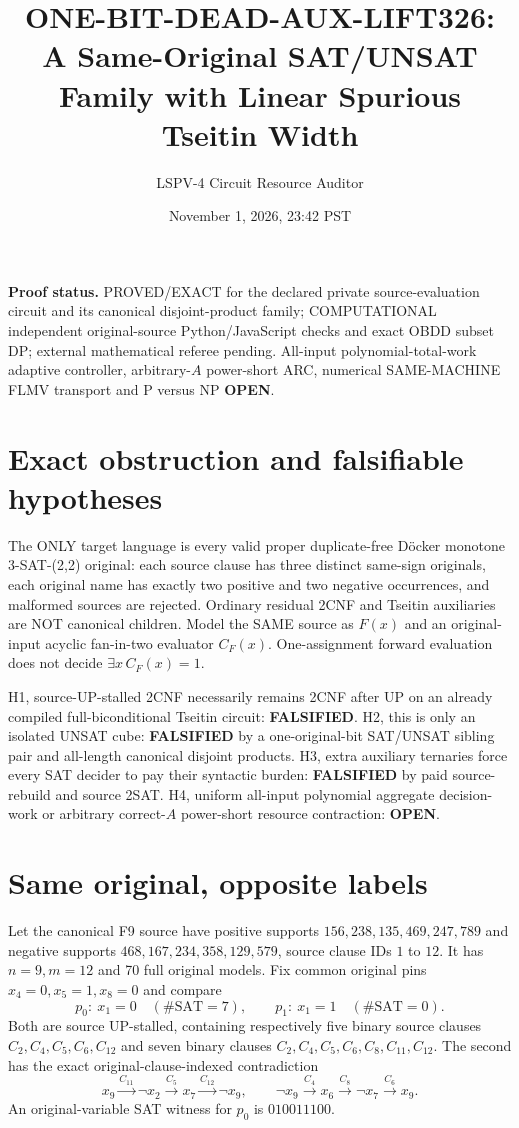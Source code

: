 \documentclass[11pt]{article}
\title{ONE-BIT-DEAD-AUX-LIFT326:\\
A Same-Original SAT/UNSAT Family with Linear Spurious Tseitin Width}
\author{LSPV-4 Circuit Resource Auditor}
\date{November 1, 2026, 23:42 PST}
\begin{document}
\maketitle
\noindent\textbf{Proof status.} PROVED/EXACT for the declared private
source-evaluation circuit and its canonical disjoint-product family;
COMPUTATIONAL independent original-source Python/JavaScript checks and
exact OBDD subset DP; external mathematical referee pending.
All-input polynomial-total-work adaptive controller, arbitrary-$A$
power-short ARC, numerical SAME-MACHINE FLMV transport and
P versus NP \textbf{OPEN}.

\section{Exact obstruction and falsifiable hypotheses}
The ONLY target language is every valid proper duplicate-free
D\"ocker monotone 3-SAT-(2,2) original: each source clause has three
distinct same-sign originals, each original name has exactly two
positive and two negative occurrences, and malformed sources are rejected.
Ordinary residual 2CNF and Tseitin auxiliaries are NOT canonical children.
Model the SAME source as $F(x)$ and an original-input acyclic
fan-in-two evaluator $C_F(x)$. One-assignment forward evaluation
does not decide $\exists x\,C_F(x)=1$.

\noindent H1, source-UP-stalled 2CNF necessarily remains 2CNF after UP
on an already compiled full-biconditional Tseitin circuit:
\textbf{FALSIFIED}. H2, this is only an isolated UNSAT cube:
\textbf{FALSIFIED} by a one-original-bit SAT/UNSAT sibling pair and
all-length canonical disjoint products. H3, extra auxiliary ternaries
force every SAT decider to pay their syntactic burden:
\textbf{FALSIFIED} by paid source-rebuild and source 2SAT.
H4, uniform all-input polynomial aggregate decision-work or arbitrary
correct-$A$ power-short resource contraction:
\textbf{OPEN}.

\section{Same original, opposite labels}
Let the canonical F9 source have positive supports
$156,238,135,469,247,789$ and negative supports
$468,167,234,358,129,579$, source clause IDs $1$ to $12$.
It has $n=9,m=12$ and 70 full original models.
Fix common original pins $x_4=0,x_5=1,x_8=0$ and compare
\[
p_0:\ x_1=0\quad(\#\mathrm{SAT}=7),\qquad
p_1:\ x_1=1\quad(\#\mathrm{SAT}=0).
\]
Both are source UP-stalled, containing respectively five binary source
clauses $C_2,C_4,C_5,C_6,C_{12}$ and seven binary clauses
$C_2,C_4,C_5,C_6,C_8,C_{11},C_{12}$.
The second has the exact original-clause-indexed contradiction
\[
x_9\xrightarrow{C_{11}}\neg x_2\xrightarrow{C_5}x_7
\xrightarrow{C_{12}}\neg x_9,\qquad
\neg x_9\xrightarrow{C_4}x_6\xrightarrow{C_8}\neg x_7
\xrightarrow{C_6}x_9.
\]
An original-variable SAT witness for $p_0$ is $010011100$.
\end{document}
